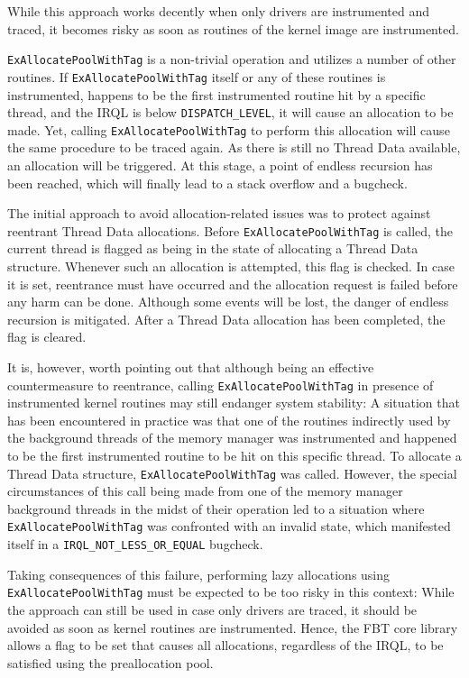 While this approach works decently when only drivers are instrumented and traced,
it becomes risky as soon as routines of the kernel image are instrumented. 

\verb|ExAllocatePoolWithTag| is a non-trivial operation and utilizes a number
of other routines. If \verb|ExAllocatePoolWithTag| itself or any of these routines
is instrumented, happens to be the first instrumented routine hit by a specific
thread, and the IRQL is below \verb|DISPATCH_LEVEL|, it will cause an allocation to be made.
Yet, calling \verb|ExAllocatePoolWithTag| to perform this allocation will cause 
the same procedure to be traced again. As there is still no Thread Data available,
an allocation will be triggered. At this stage, a point of
endless recursion has been reached, which will finally lead to a stack overflow and a bugcheck.

The initial approach to avoid allocation-related issues was to protect
against reentrant Thread Data allocations. Before \verb|ExAllocatePoolWithTag| is called,
the current thread is flagged as being in the state of allocating a Thread
Data structure. Whenever such an allocation is attempted, this flag is checked. In 
case it is set, reentrance must have occurred and the allocation request
is failed before any harm can be done. Although some events will be lost,
the danger of endless recursion is mitigated. After a Thread Data allocation has been
completed, the flag is cleared.

It is, however, worth pointing out that although being an effective 
countermeasure to reentrance, calling \verb|ExAllocatePoolWithTag| in
presence of instrumented kernel routines may still endanger system
stability: A situation that has been encountered in practice was that
one of the routines indirectly used by the background threads of the
memory manager was instrumented and happened to be the first instrumented 
routine to be hit on this specific thread. To allocate a Thread Data structure, 
\verb|ExAllocatePoolWithTag| was called. However, the special circumstances
of this call being made from one of the memory manager background threads
in the midst of their operation led to a situation where 
\verb|ExAllocatePoolWithTag| was confronted with an invalid state, 
which manifested itself in a \verb|IRQL_NOT_LESS_OR_EQUAL| bugcheck.

Taking consequences of this failure, performing lazy allocations using
\verb|ExAllocatePoolWithTag| must be expected to be too risky in this context: While
the approach can still be used in case only drivers are traced,
it should be avoided as soon as kernel routines are instrumented. Hence,
the FBT core library allows a flag to be set that causes all allocations,
regardless of the IRQL, to be satisfied using the preallocation pool.

